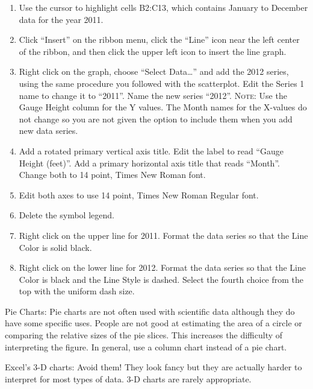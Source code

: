\documentclass[12pt, hidelinks]{exam}
\begin{document}
\begin{enumerate}
	\item Use the cursor to highlight cells B2:C13, which contains January to December data for the year 2011.

	\item Click “Insert” on the ribbon menu, click the “Line” icon near the left center of the ribbon, and then click the upper left icon to insert the line graph.

	\item Right click on the graph, choose “Select Data\dots” and add the 2012 series, using the same procedure you followed with the scatterplot. Edit the Series 1 name to change it to “2011”. Name the new series “2012”. \textsc{Note}: Use the Gauge Height column for the Y values. The Month names for the X-values do not change so you are not given the option to include them when you add new data series.

	\item Add a rotated primary vertical axis title. Edit the label to read “Gauge Height (feet)”. Add a primary horizontal axis title that reads “Month”. Change both to 14 point, Times New Roman font.

	\item Edit both axes to use 14 point, Times New Roman Regular font.

	\item Delete the symbol legend.

	\item Right click on the upper line for 2011. Format the data series so that the Line Color is solid black.

	\item Right click on the lower line for 2012. Format the data series so that the Line Color is black and the Line Style is dashed. Select the fourth choice from the top with the uniform dash size. 
\end{enumerate}

Pie Charts: Pie charts are not often used with scientific data although they do have some specific uses. People are not good at estimating the area of a circle or comparing the relative sizes of the pie slices. This increases the difficulty of interpreting the figure. In general, use a column chart instead of a pie chart. 

Excel’s 3-D charts: Avoid them! They look fancy but they are actually harder to interpret for most types of data. 3-D charts are rarely appropriate. 
\end{document}
